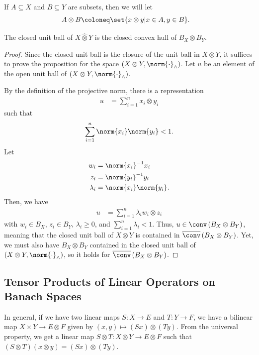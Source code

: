 \documentclass[10pt]{mypackage}
\begin{document}
If $A\subseteq X$ and $B\subseteq Y$ are subsets, then we will let
\begin{align*}
  A\otimes B &\coloneq \set{x\otimes y | x\in A,y\in B}.
\end{align*}
\begin{proposition}
  The closed unit ball of $X\hat{\otimes}Y$ is the closed convex hull of $B_{X}\otimes B_{Y}$.
\end{proposition}
\begin{proof}
  Since the closed unit ball is the closure of the unit ball in $X\otimes Y$, it suffices to prove the proposition for the space $\left( X\otimes Y,\norm{\cdot}_{\wedge} \right)$. Let $u$ be an element of the open unit ball of $\left( X\otimes Y,\norm{\cdot}_{\wedge} \right)$.

  By the definition of the projective norm, there is a representation
  \begin{align*}
    u &= \sum_{i=1}^{n} x_i\otimes y_i
  \end{align*}
  such that
  \begin{align*}
    \sum_{i=1}^{n}\norm{x_i}\norm{y_i} < 1.
  \end{align*}
  Let
  \begin{align*}
    w_i &= \norm{x_i}^{-1}x_i\\
    z_i &= \norm{y_i}^{-1}y_i\\
    \lambda_i &= \norm{x_i}\norm{y_i}.
  \end{align*}
  Then, we have
  \begin{align*}
    u &= \sum_{i=1}^{n}\lambda_iw_i\otimes z_i
  \end{align*}
  with $w_i\in B_X$, $z_i\in B_Y$, $\lambda_i \geq 0$, and $\sum_{i=1}^{n}\lambda_i < 1$. Thus, $u\in \conv\left(B_X\otimes B_Y\right)$, meaning that the closed unit ball of $X\otimes Y$ is contained in $ \overline{\conv}\left(B_X\otimes B_Y\right) $. Yet, we must also have $ B_X\otimes B_Y $ contained in the closed unit ball of $\left( X\otimes Y,\norm{\cdot}_{\wedge} \right)$, so it holds for $ \overline{\conv}\left(B_X\otimes B_Y\right) $.
\end{proof}
\subsection{Tensor Products of Linear Operators on Banach Spaces}%
In general, if we have two linear maps $S\colon X\rightarrow E$ and $T\colon Y\rightarrow F$, we have a bilinear map $X\times Y\rightarrow E\otimes F$ given by $\left( x,y \right)\mapsto \left( Sx \right)\otimes \left( Ty \right)$. From the universal property, we get a linear map $S\otimes T\colon X\otimes Y\rightarrow E\otimes F$ such that $\left( S\otimes T \right)\left( x\otimes y \right) = \left( Sx \right)\otimes \left( Ty \right)$.
\end{document}
